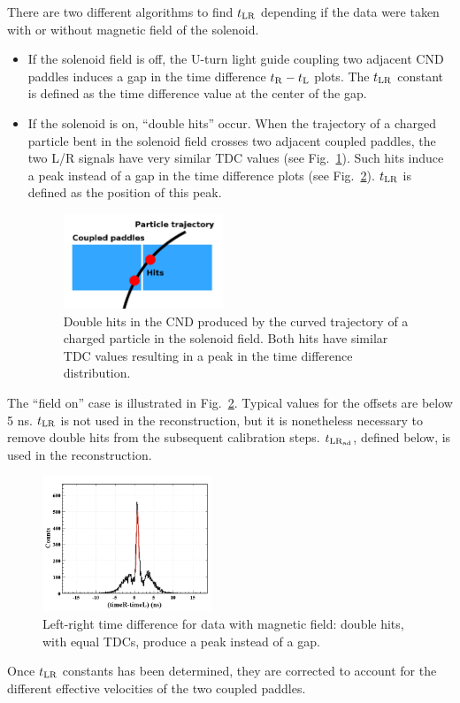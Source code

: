 There are two different algorithms to find $t_{\rm{LR}}$ depending if the data were taken with or without magnetic field of the solenoid. 
\begin{itemize}
\item If the solenoid field is off, the U-turn light guide coupling two adjacent CND paddles induces a gap in the time difference $t_{\rm{R}}-t_{\rm{L}}$ plots. The $t_{\rm{LR}}$ constant is defined as the time difference value at the center of the gap.
\item If the solenoid is on, ``double hits'' occur. When the trajectory of a charged particle bent in the solenoid field crosses two adjacent coupled paddles, the two L/R signals have very similar TDC values (see Fig.~\ref{doublehit}). Such hits induce a peak instead of a gap in the time difference plots (see Fig.~\ref{LR}). $t_{\rm{LR}}$ is defined as the position of this peak.

\begin{figure}[htb]
\begin{center}
\includegraphics[width=0.45\textwidth]{Figure/doublehit.png} 
\end{center}
\caption{Double hits in the CND produced by the curved trajectory of a charged particle in the solenoid field. Both hits have similar TDC values resulting in a peak in the time difference distribution.}
\label{doublehit}
\end{figure}

\end{itemize}
The ``field on'' case is illustrated in Fig.~\ref{LR}. Typical values for the offsets are below 5 ns. $t_{\rm{LR}}$ is not used in the reconstruction, but it is nonetheless necessary to remove double hits from the subsequent calibration steps. $t_{\rm{LR}_{\rm{ad}}}$, defined below, is used in the reconstruction.
%
\begin{figure}[htb]
\begin{center}
\includegraphics[width=0.45\textwidth]{Figure/field.png} 
\end{center}
\caption{Left-right time difference for data with magnetic field: double hits, with equal TDCs, produce a peak instead of a gap.}
\label{LR}
\end{figure}
%
Once $t_{\rm{LR}}$ constants has been determined, they are corrected to account for the different effective velocities of the two coupled paddles.


